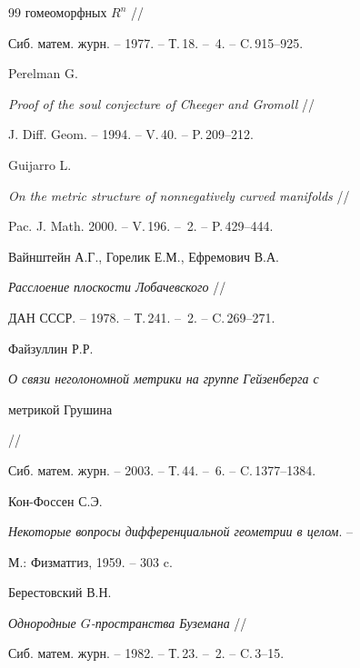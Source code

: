 \begin{thebibliography}{99}
{гомеоморфных $R^{n}$} //


 Сиб. матем. журн. -- 1977. -- Т.\,18. -- \No\,4. -- C.\,915--925.







Perelman G.


 {\em Proof of the soul conjecture of Cheeger and Gromoll} //


 J. Diff. Geom. -- 1994. -- V.\,40. -- P.\,209--212.







Guijarro L.


 {\em On the metric structure of nonnegatively curved manifolds} //


 Pac. J. Math. 2000. -- V.\,196. -- \No\,2. -- P.\,429--444.







Вайнштейн А.Г., Горелик Е.М., Ефремович В.А.


 {\em Расслоение плоскости Лобачевского} //


 ДАН СССР. -- 1978. -- Т.\,241. -- \No\,2. -- C.\,269--271.







Файзуллин Р.Р.


 {\em О связи неголономной метрики на группе Гейзенберга с


метрикой Грушина} //


 Сиб. матем. журн. -- 2003. -- Т.\,44. -- \No\,6. -- C.\,1377--1384.







Кон-Фоссен С.Э.


 {\em Некоторые вопросы дифференциальной геометрии в целом}. --


 М.: Физматгиз, 1959. -- 303 c.







Берестовский В.Н.


 {\em Однородные $G$-пространства Буземана} //


 Сиб. матем. журн. -- 1982. -- Т.\,23. -- \No\,2. -- C.\,3--15.






\end{thebibliography}
